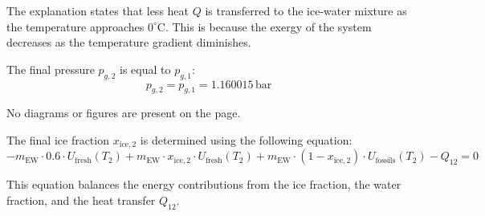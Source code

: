 The explanation states that less heat \( Q \) is transferred to the ice-water mixture as the temperature approaches \( 0^\circ\text{C} \). This is because the exergy of the system decreases as the temperature gradient diminishes.  

The final pressure \( p_{g,2} \) is equal to \( p_{g,1} \):  
\[
p_{g,2} = p_{g,1} = 1.160015 \, \text{bar}
\]  

No diagrams or figures are present on the page.

The final ice fraction \( x_{\text{ice},2} \) is determined using the following equation:  
\[
- m_{\text{EW}} \cdot 0.6 \cdot U_{\text{fresh}}(T_2) + m_{\text{EW}} \cdot x_{\text{ice},2} \cdot U_{\text{fresh}}(T_2) + m_{\text{EW}} \cdot (1 - x_{\text{ice},2}) \cdot U_{\text{fossils}}(T_2) - Q_{12} = 0
\]  

This equation balances the energy contributions from the ice fraction, the water fraction, and the heat transfer \( Q_{12} \).
